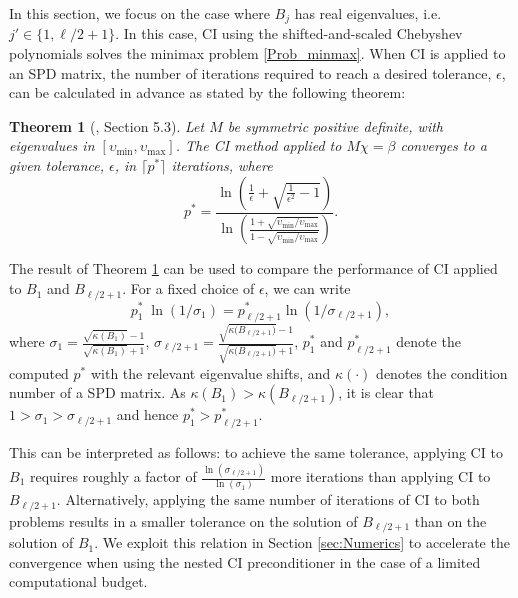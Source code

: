 \documentclass{article}
\newtheorem{thm}{Theorem}
\theoremstyle{definition}
\begin{document}
{		In this section, we focus on the case where $B_j$ has real eigenvalues, i.e. $j' \in \{1, \ell/2 + 1\}$. In this case, CI using the shifted-and-scaled Chebyshev polynomials solves the minimax problem \eqref{Prob_minmax}. 
		When CI is applied to an SPD matrix, the number of iterations required to reach a desired tolerance, $\epsilon$, can be calculated in advance \cite{axelsson1996iterative} as stated by the following theorem:
		
		\begin{thm}[\cite{axelsson1996iterative}, Section 5.3]\label{thm:AxelssonIteration}
			Let $M$ be symmetric positive definite, with eigenvalues in $[\upsilon_{\min},\upsilon_{\max}]$. The CI method applied to $M\chi = \beta$ converges to a given tolerance, $\epsilon$, in $\lceil p^* \rceil$ iterations, where
			\begin{equation*}
				p^* = \frac{\ln\left(\frac{1}{\epsilon}+ \sqrt{\frac{1}{\epsilon^2}-1}\right)}{\ln\left(\frac{1+\sqrt{\upsilon_{\min}/\upsilon_{\max}}}{1-\sqrt{\upsilon_{\min}/\upsilon_{\max}}}\right)}.
			\end{equation*}
		\end{thm}
		The result of Theorem \ref{thm:AxelssonIteration} can be used to compare the performance of CI applied to $B_1$ and $B_{\ell/2+1}.$ 
		For a fixed choice of $\epsilon$, we can write
		\begin{equation*}
			p^*_1 \; {\ln(1/\sigma_1)} = p^*_{\ell/2+1} \ln(1/\sigma_{\ell/2+1}),
		\end{equation*}
		where
		$\sigma_1 = \frac{\sqrt{\kappa(
				{B_1})}-1}{\sqrt{\kappa({B_1})}+1}$,  
		$\sigma_{\ell/2+1} = \frac{\sqrt{\kappa({B_{\ell/2+1})}}-1}{\sqrt{\kappa({B_{\ell/2+1})}}+1}$, $p^*_1$ and $p^*_{\ell/2+1}$ denote the computed $p^*$ with the relevant eigenvalue shifts, and 
		$\kappa(\cdot)$ denotes the condition number of a SPD matrix. 
		As $\kappa(B_1) > \kappa(B_{\ell/2+1})$, it is clear that $1>\sigma_{1}>\sigma_{\ell/2+1}$ and hence $p^*_1 > p^*_{\ell/2+1}$.
		
		This can be interpreted as follows: to achieve the same tolerance, applying CI to $B_1$ requires roughly a factor of $\frac{\ln(\sigma_{\ell/2+1})}{\ln(\sigma_1)}$ more iterations than applying CI to $B_{\ell/2+1}$. Alternatively, applying the same number of iterations of CI to both problems results in a smaller tolerance on the solution of $B_{\ell/2+1}$ than on the solution of $B_1$. We exploit this relation in Section \ref{sec:Numerics} to accelerate the convergence when using the nested CI preconditioner in the case of a limited computational budget.
		
}
\end{document}
